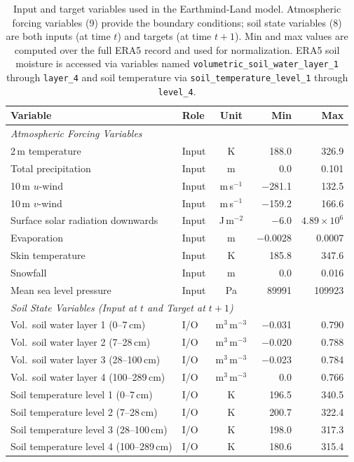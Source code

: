 \documentclass[11pt]{article}
\begin{document}
\begin{table}[htbp]
\centering
\caption{Input and target variables used in the Earthmind-Land model. Atmospheric forcing variables (9) provide the boundary conditions; soil state variables (8) are both inputs (at time $t$) and targets (at time $t+1$). Min and max values are computed over the full ERA5 record and used for normalization. ERA5 soil moisture is accessed via variables named \texttt{volumetric\_soil\_water\_layer\_1} through \texttt{layer\_4} and soil temperature via \texttt{soil\_temperature\_level\_1} through \texttt{level\_4}.}
\label{tab:variables}
\small
\begin{tabular}{@{}llcrr@{}}
\toprule
\textbf{Variable} & \textbf{Role} & \textbf{Unit} & \textbf{Min} & \textbf{Max} \\
\midrule
\multicolumn{5}{l}{\textit{Atmospheric Forcing Variables}} \\
2\,m temperature & Input & K & 188.0 & 326.9 \\
Total precipitation & Input & m & 0.0 & 0.101 \\
10\,m $u$-wind & Input & m\,s$^{-1}$ & $-$281.1 & 132.5 \\
10\,m $v$-wind & Input & m\,s$^{-1}$ & $-$159.2 & 166.6 \\
Surface solar radiation downwards & Input & J\,m$^{-2}$ & $-$6.0 & $4.89\times10^6$ \\
Evaporation & Input & m & $-$0.0028 & 0.0007 \\
Skin temperature & Input & K & 185.8 & 347.6 \\
Snowfall & Input & m & 0.0 & 0.016 \\
Mean sea level pressure & Input & Pa & 89991 & 109923 \\
\midrule
\multicolumn{5}{l}{\textit{Soil State Variables (Input at $t$ and Target at $t+1$)}} \\
Vol.\ soil water layer 1 (0--7\,cm) & I/O & m$^3$\,m$^{-3}$ & $-$0.031 & 0.790 \\
Vol.\ soil water layer 2 (7--28\,cm) & I/O & m$^3$\,m$^{-3}$ & $-$0.020 & 0.788 \\
Vol.\ soil water layer 3 (28--100\,cm) & I/O & m$^3$\,m$^{-3}$ & $-$0.023 & 0.784 \\
Vol.\ soil water layer 4 (100--289\,cm) & I/O & m$^3$\,m$^{-3}$ & 0.0 & 0.766 \\
Soil temperature level 1 (0--7\,cm) & I/O & K & 196.5 & 340.5 \\
Soil temperature level 2 (7--28\,cm) & I/O & K & 200.7 & 322.4 \\
Soil temperature level 3 (28--100\,cm) & I/O & K & 198.0 & 317.3 \\
Soil temperature level 4 (100--289\,cm) & I/O & K & 180.6 & 315.4 \\
\bottomrule
\end{tabular}
\end{table}
\end{document}
